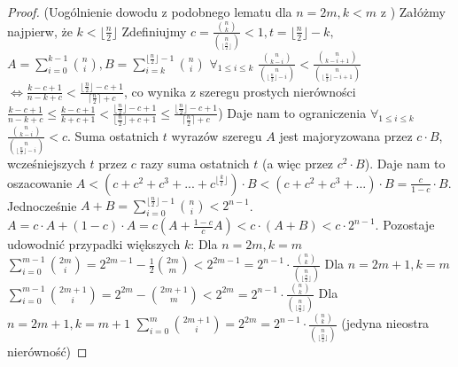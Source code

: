 \documentclass{pracamgr}
\begin{document}
   \begin{proof}
    (Uogólnienie dowodu z podobnego lematu dla $n=2m,k<m$ z \cite{LPV})\newline%
    Załóżmy najpierw, że $k<\lfloor\frac{n}{2}\rfloor$\newline
    Zdefiniujmy $c=\frac{{n\choose k}}{{n\choose \lfloor\frac{n}{2}\rfloor}}<1,t=\lfloor\frac{n}{2}\rfloor-k,$
    $A=\sum_{i=0}^{k-1}{n\choose i}, B=\sum_{i=k}^{\lfloor\frac{n}{2}\rfloor-1}{n\choose i}$\newline
    $\forall_{1\le i\le k}$ $\frac{{n\choose k-i}}{{n\choose \lfloor\frac{n}{2}\rfloor-i}}<\frac{{n\choose k-i+1}}{{n\choose \lfloor\frac{n}{2}\rfloor-i+1}}$
    $\Leftrightarrow \frac{k-c+1}{n-k+c}<\frac{\lfloor\frac{n}{2}\rfloor-c+1}{\lceil\frac{n}{2}\rceil+c}$,\newline
    co wynika z szeregu prostych nierówności $\frac{k-c+1}{n-k+c}\le\frac{k-c+1}{k+c+1}
    <\frac{\lfloor\frac{n}{2}\rfloor-c+1}{\lfloor\frac{n}{2}\rfloor+c+1}\le\frac{\lfloor\frac{n}{2}\rfloor-c+1}{\lceil\frac{n}{2}\rceil+c}$)\newline
    Daje nam to ograniczenia $\forall_{1\le i\le k}$ $\frac{{n\choose k-i}}{{n\choose \lfloor\frac{n}{2}\rfloor-i}}<c$.\newline
    Suma ostatnich $t$ wyrazów szeregu $A$ jest majoryzowana przez $c\cdot B$, wcześniejszych $t$ przez $c$ razy suma ostatnich $t$ (a więc przez $c^2\cdot B$).
    Daje nam to oszacowanie $A<(c+c^2+c^3+...+c^{\lfloor\frac{k}{t}\rfloor})\cdot B<(c+c^2+c^3+...)\cdot B=\frac{c}{1-c}\cdot B$.
    Jednocześnie $A+B=\sum_{i=0}^{\lfloor\frac{n}{2}\rfloor-1}{n\choose i}<2^{n-1}$.
    $A=c\cdot A+(1-c)\cdot A=c(A+\frac{1-c}{c}A)<c\cdot(A+B)<c\cdot 2^{n-1}$.\newline
    Pozostaje udowodnić przypadki większych $k$:\newline
    Dla $n=2m,k=m$ $\sum_{i=0}^{m-1}{2m\choose i}=2^{2m-1}-\frac{1}{2}{2m\choose m}<2^{2m-1}=
    2^{n-1}\cdot\frac{{n\choose k}}{{n\choose \lfloor\frac{n}{2}\rfloor}}$\newline
    Dla $n=2m+1,k=m$ $\sum_{i=0}^{m-1}{2m+1\choose i}=2^{2m}-{2m+1\choose m}<2^{2m}=
    2^{n-1}\cdot\frac{{n\choose k}}{{n\choose \lfloor\frac{n}{2}\rfloor}}$\newline
    Dla $n=2m+1,k=m+1$ $\sum_{i=0}^{m}{2m+1\choose i}=2^{2m}=
    2^{n-1}\cdot\frac{{n\choose k}}{{n\choose \lfloor\frac{n}{2}\rfloor}}$ (jedyna nieostra nierówność)\newline
   \end{proof}
\end{document}
